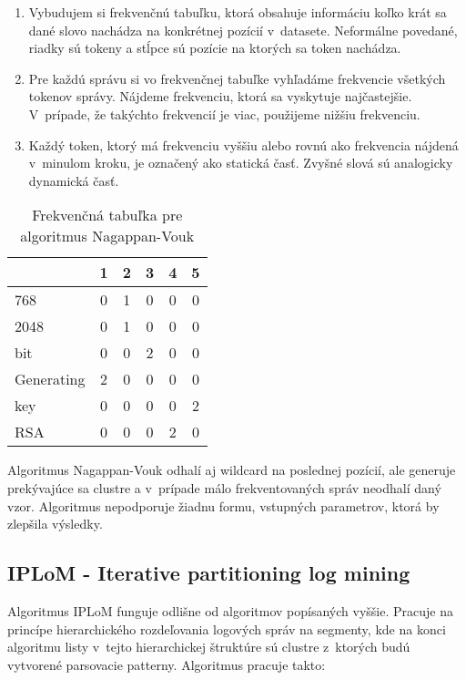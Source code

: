\begin{enumerate}
  \item Vybudujem si frekvenčnú tabuľku, ktorá obsahuje informáciu koľko krát sa dané slovo nachádza na konkrétnej pozícií v~datasete. Neformálne povedané, riadky sú tokeny a stĺpce sú pozície na ktorých sa token nachádza.
  \item Pre každú správu si vo frekvenčnej tabuľke vyhľadáme frekvencie všetkých tokenov správy. Nájdeme frekvenciu, ktorá sa vyskytuje najčastejšie. V~prípade, že takýchto frekvencií je viac, použijeme nižšiu frekvenciu.
  \item Každý token, ktorý má frekvenciu vyššiu alebo rovnú ako frekvencia nájdená v~minulom kroku, je označený ako statická časť. Zvyšné slová sú analogicky dynamická časť.
\end{enumerate}

\begin{table}[htbp]
\centering
\begin{tabularx}{175px}{ | X | c | c | c | c | c | }
\hline
           & 1 & 2 & 3 & 4 & 5 \\ \hline
768        & 0 & 1 & 0 & 0 & 0 \\ \hline
2048       & 0 & 1 & 0 & 0 & 0 \\ \hline
bit        & 0 & 0 & 2 & 0 & 0 \\ \hline
Generating & 2 & 0 & 0 & 0 & 0 \\ \hline
key        & 0 & 0 & 0 & 0 & 2 \\ \hline
RSA        & 0 & 0 & 0 & 2 & 0 \\ \hline
\end{tabularx}
\caption{Frekvenčná tabuľka pre algoritmus Nagappan-Vouk}
\label{fig:naggapan}
\end{table}

Algoritmus Nagappan-Vouk odhalí aj wildcard na poslednej pozícií, ale generuje prekývajúce sa clustre a v~prípade málo frekventovaných správ neodhalí daný vzor. Algoritmus nepodporuje žiadnu formu, vstupných parametrov, ktorá by zlepšila výsledky.

\subsection{IPLoM - Iterative partitioning log mining}
Algoritmus IPLoM \parencite{iplom}  funguje odlišne od algoritmov popísaných vyššie. Pracuje na princípe hierarchického rozdeľovania logových správ na segmenty, kde na konci algoritmu listy v~tejto hierarchickej štruktúre sú clustre z~ktorých budú vytvorené parsovacie patterny. Algoritmus pracuje takto:

